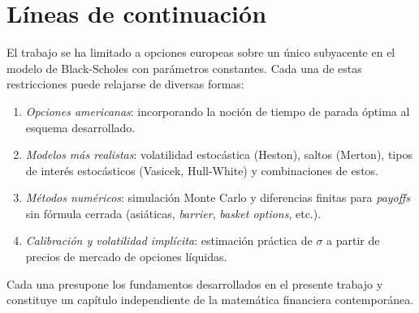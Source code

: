 \documentclass[11pt,a4paper,oneside]{report}
\theoremstyle{plain}
\theoremstyle{definition}
\theoremstyle{remark}
\newcommand{\1}{\mathbf{1}}
\begin{document}
\section{Líneas de continuación}
\label{sec:lineas_continuacion}

El trabajo se ha limitado a opciones europeas sobre un único subyacente
en el modelo de Black-Scholes con parámetros constantes. Cada una de
estas restricciones puede relajarse de diversas formas:

\begin{enumerate}[leftmargin=*]
  \item \emph{Opciones americanas}: incorporando la noción de
        tiempo de parada óptima al esquema desarrollado.
  \item \emph{Modelos más realistas}: volatilidad estocástica
        (Heston), saltos (Merton), tipos de interés estocásticos
        (Vasicek, Hull-White) y combinaciones de estos.
  \item \emph{Métodos numéricos}: simulación Monte Carlo y diferencias
        finitas para \emph{payoffs} sin fórmula cerrada (asiáticas,
        \emph{barrier}, \emph{basket options}, etc.).
  \item \emph{Calibración y volatilidad implícita}: estimación práctica
        de $\sigma$ a partir de precios de mercado de opciones líquidas.
\end{enumerate}

Cada una presupone los fundamentos desarrollados en el presente
trabajo y constituye un capítulo independiente de la matemática
financiera contemporánea.
\end{document}
